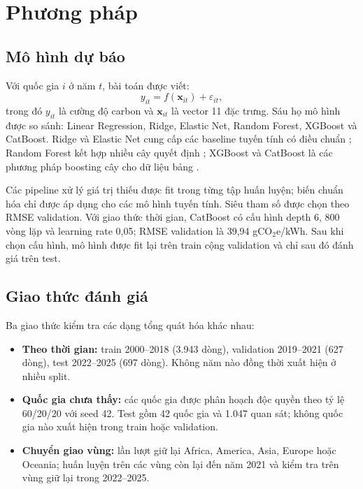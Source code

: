 \documentclass[11pt,a4paper]{article}
\begin{document}
\section{Phương pháp}

\subsection{Mô hình dự báo}

Với quốc gia $i$ ở năm $t$, bài toán được viết:
\begin{equation}
  y_{it}=f(\mathbf{x}_{it})+\varepsilon_{it},
\end{equation}
trong đó $y_{it}$ là cường độ carbon và $\mathbf{x}_{it}$ là vector 11 đặc
trưng. Sáu họ mô hình được so sánh: Linear Regression, Ridge, Elastic Net,
Random Forest, XGBoost và CatBoost. Ridge và Elastic Net cung cấp các baseline
tuyến tính có điều chuẩn \citep{hoerl1970,zou2005}; Random Forest kết hợp
nhiều cây quyết định \citep{breiman2001}; XGBoost và CatBoost là các phương
pháp boosting cây cho dữ liệu bảng \citep{chen2016,prokhorenkova2018}.

Các pipeline xử lý giá trị thiếu được fit trong từng tập huấn luyện; biến
chuẩn hóa chỉ được áp dụng cho các mô hình tuyến tính. Siêu tham số được chọn
theo RMSE validation. Với giao thức thời gian, CatBoost có cấu hình depth 6,
800 vòng lặp và learning rate 0,05; RMSE validation là 39,94 gCO$_2$e/kWh.
Sau khi chọn cấu hình, mô hình được fit lại trên train cộng validation và chỉ
sau đó đánh giá trên test.

\subsection{Giao thức đánh giá}

Ba giao thức kiểm tra các dạng tổng quát hóa khác nhau:
\begin{itemize}
  \item \textbf{Theo thời gian:} train 2000--2018 (3.943 dòng), validation
  2019--2021 (627 dòng), test 2022--2025 (697 dòng). Không năm nào đồng thời
  xuất hiện ở nhiều split.
  \item \textbf{Quốc gia chưa thấy:} các quốc gia được phân hoạch độc quyền
  theo tỷ lệ 60/20/20 với seed 42. Test gồm 42 quốc gia và 1.047 quan sát;
  không quốc gia nào xuất hiện trong train hoặc validation.
  \item \textbf{Chuyển giao vùng:} lần lượt giữ lại Africa, America, Asia,
  Europe hoặc Oceania; huấn luyện trên các vùng còn lại đến năm 2021 và kiểm
  tra trên vùng giữ lại trong 2022--2025.
\end{itemize}
\end{document}
